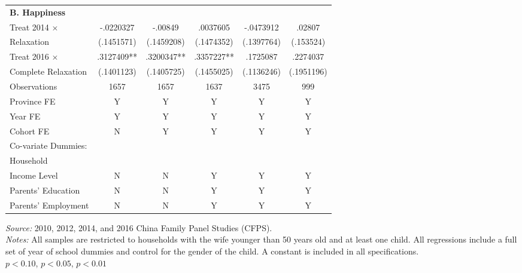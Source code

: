 \documentclass[12pt]{extarticle}
\begin{document}
\begin{table}
\begin{threeparttable}
\begin{tabular}{l*{5}{c}}
\textbf{B. Happiness} \\
Treat 2014 $\times$ &   -.0220327   &     -.00849   &    .0037605   &   -.0473912   &      .02807   \\
\quad 2014 Relaxation     &  (.1451571)   &  (.1459208)   &  (.1474352)   &  (.1397764)   &   (.153524)   \\
Treat 2016 $\times$ &    .3127409** &    .3200347** &    .3357227** &    .1725087   &    .2274037   \\
\quad Complete Relaxation &  (.1401123)   &  (.1405725)   &  (.1455025)   &  (.1136246)   &  (.1951196)   \\
Observations        &        1657   &        1657   &        1637   &        3475   &         999   \\
\hline
Province FE &  Y &  Y & Y & Y & Y \\
Year FE &  Y &  Y & Y & Y & Y \\
Cohort FE & N & Y & Y & Y & Y \\
Co-variate Dummies: \\
\quad Household \\
\qquad Income Level & N & N & Y & Y & Y \\
\quad Parents' Education &  N &  N & Y & Y & Y \\
\quad Parents' Employment &  N &  N & Y & Y & Y \\
\hline\hline
\end{tabular}
\begin{tablenotes}
\footnotesize \textit{Source:} 2010, 2012, 2014, and 2016 China Family Panel Studies (CFPS). \\
\textit{Notes:} All samples are restricted to households with the wife younger than 50 years old and at least one child. All regressions include a full set of year of school dummies and control for the gender of the child. A constant is included in all specifications. \\
\quad \sym{*} \(p<0.10\), \sym{**} \(p<0.05\), \sym{***} \(p<0.01\)
\end{tablenotes}
\end{threeparttable}
\end{table}
\end{document}
